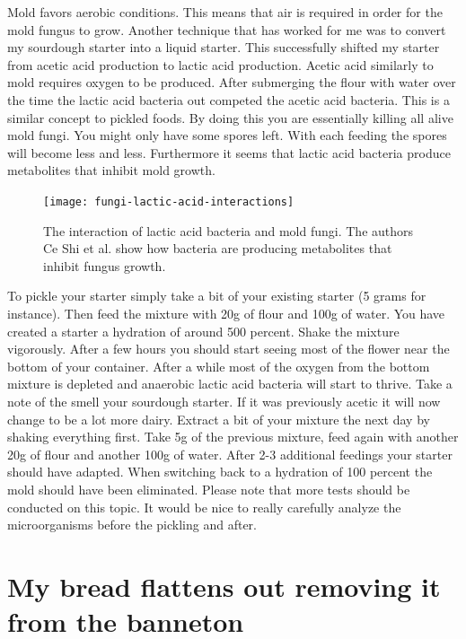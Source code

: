 Mold favors aerobic conditions. This means that air is required in order
for the mold fungus to grow. Another technique that has worked for me
was to convert my sourdough starter into a liquid starter. This successfully
shifted my starter from acetic acid production to lactic acid production.
Acetic acid similarly to mold requires oxygen to be produced. After
submerging the flour with water over the time the lactic acid bacteria
out competed the acetic acid bacteria. This is a similar concept to pickled
foods. By doing this you are essentially killing all alive mold fungi. You
might only have some spores left. With each feeding the spores will become
less and less. Furthermore it seems that lactic acid bacteria produce
metabolites that inhibit mold growth. \cite{mold+lactic+acid+bacteria}

\begin{figure}[!htb]
  \texttt{[image: fungi-lactic-acid-interactions]}
  \caption{The interaction of lactic acid bacteria and mold fungi.
           The authors Ce Shi et al. show how bacteria are producing
           metabolites that inhibit fungus growth. \cite{mold+lactic+acid+bacteria}}
  \label{fig:fungi-lactic-acid-interactions}
\end{figure}

To pickle your starter simply take a bit of your existing starter (5 grams for
instance). Then feed the mixture with 20g of flour and 100g of water. You have
created a starter a hydration of around 500 percent. Shake the mixture vigorously.
After a few hours you should start seeing most of the flower near the bottom
of your container. After a while most of the oxygen from the bottom mixture
is depleted and anaerobic lactic acid bacteria will start to thrive. Take a
note of the smell your sourdough starter. If it was previously acetic
it will now change to be a lot more dairy. Extract a bit of your mixture the
next day by shaking everything first. Take 5g of the previous mixture, feed
again with another 20g of flour and another 100g of water. After 2-3
additional feedings your starter should have adapted. When switching back
to a hydration of 100 percent the mold should have been eliminated. Please note that
more tests should be conducted on this topic. It would be nice to really
carefully analyze the microorganisms before the pickling and after.

\section{My bread flattens out removing it from the banneton}

